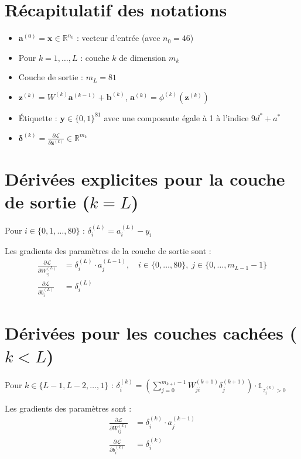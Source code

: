 \documentclass[12pt,a4paper]{report}
\numberwithin{equation}{section}
\begin{document}
\section{Récapitulatif des notations}
\begin{itemize}
  \item $\mathbf{a}^{(0)} = \mathbf{x} \in \mathbb{R}^{n_0}$ : vecteur d'entrée (avec $n_0 = 46$)
  \item Pour $k = 1, \ldots, L$ : couche $k$ de dimension $m_k$
  \item Couche de sortie : $m_L = 81$
  \item $\mathbf{z}^{(k)} = W^{(k)} \mathbf{a}^{(k-1)} + \mathbf{b}^{(k)}$, $\mathbf{a}^{(k)} = \phi^{(k)}(\mathbf{z}^{(k)})$
  \item Étiquette : $\mathbf{y} \in \{0,1\}^{81}$ avec une composante égale à 1 à l'indice $9d^* + a^*$
  \item $\boldsymbol{\delta}^{(k)} = \frac{\partial \mathcal{L}}{\partial \mathbf{z}^{(k)}} \in \mathbb{R}^{m_k}$
\end{itemize}

\section{Dérivées explicites pour la couche de sortie ($k = L$)}

\begin{theorem}
Pour $i \in \{0, 1, \ldots, 80\}$ :
$\delta^{(L)}_i = a^{(L)}_i - y_i$

Les gradients des paramètres de la couche de sortie sont :
\begin{align}
\frac{\partial \mathcal{L}}{\partial W^{(L)}_{ij}} &= \delta^{(L)}_i \cdot a^{(L-1)}_j, \quad i \in \{0, \ldots, 80\}, \; j \in \{0, \ldots, m_{L-1}-1\}\\
\frac{\partial \mathcal{L}}{\partial b^{(L)}_i} &= \delta^{(L)}_i
\end{align}
\end{theorem}

\section{Dérivées pour les couches cachées ($k < L$)}

\begin{theorem}
Pour $k \in \{L-1, L-2, \ldots, 1\}$ :
$\delta^{(k)}_i = \left(\sum_{j=0}^{m_{k+1}-1} W^{(k+1)}_{ji} \delta^{(k+1)}_j\right) \cdot \mathbb{1}_{z^{(k)}_i > 0}$

Les gradients des paramètres sont :
\begin{align}
\frac{\partial \mathcal{L}}{\partial W^{(k)}_{ij}} &= \delta^{(k)}_i \cdot a^{(k-1)}_j\\
\frac{\partial \mathcal{L}}{\partial b^{(k)}_i} &= \delta^{(k)}_i
\end{align}
\end{theorem}
\end{document}
